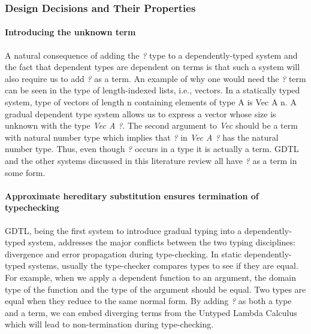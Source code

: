 \documentclass{article}
\theoremstyle{definition}
\newcommand{\Scode}[1]{{\fontfamily{cmss}\selectfont\color{Mahogany}#1}}
\newcommand{\Gcode}[1]{{\color{OliveGreen}\textit{#1}}}
\begin{document}
\subsubsection{Design Decisions and Their Properties}\label{subsec:gdtl_design_properties}

\paragraph{Introducing the unknown term}
A natural consequence of adding the \Gcode{?} type to a dependently-typed system
and the fact that dependent types are dependent on terms is that such a system
will also require us to add \Gcode{?} as a term. An example of why one would
need the \Gcode{?} term can be seen in the type of length-indexed lists, i.e.,
vectors. In a statically typed system, type of vectors of length \Scode{n}
containing elements of type \Scode{A} is \Scode{Vec A n}. A gradual dependent
type system allows us to express a vector whose size is unknown with the type
\Gcode{Vec A ?}. The second argument to \Gcode{Vec} should be a term with
natural number type which implies that \Gcode{?} in \Gcode{Vec A ?} has the
natural number type. Thus, even though \Gcode{?} occurs in a type it is actually
a term. GDTL and the other systems discussed in this literature review all have
\Gcode{?} as a term in some form.

\paragraph{Approximate hereditary substitution ensures termination of typechecking}

GDTL, being the first system to introduce gradual typing into a
dependently-typed system, addresses the major conflicts between the two typing
disciplines: divergence and error propagation during type-checking. In static
dependently-typed systems, usually the type-checker compares types to see if
they are equal. For example, when we apply a dependent function to an argument,
the domain type of the function and the type of the argument should be equal.
Two types are equal when they reduce to the same normal form. By adding
\Gcode{?} as both a type and a term, we can embed diverging terms from the
Untyped Lambda Calculus which will lead to non-termination during type-checking.
\end{document}
